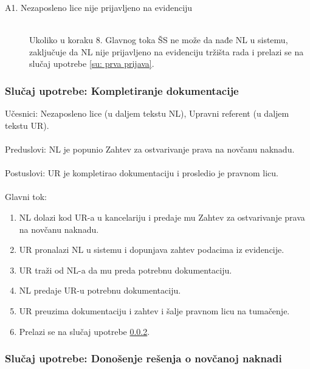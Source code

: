 \begin{description}
	\item[A1. Nezaposleno lice nije prijavljeno na evidenciju] ~\\
	Ukoliko u koraku 8. Glavnog toka ŠS ne može da nađe NL u sistemu, zaključuje da NL nije prijavljeno na evidenciju tržišta rada i prelazi se na slučaj upotrebe \ref{su: prva prijava}.
\end{description}

\subsubsection{Slu\v caj upotrebe: Kompletiranje dokumentacije}
\label{su: kompletiranje dokumentacije}

\noindent Učesnici: Nezaposleno lice (u daljem tekstu NL), Upravni referent (u daljem tekstu UR).
\\
\\ Preduslovi: NL je popunio Zahtev za ostvarivanje prava na novčanu naknadu.
\\
\\ Postuslovi: UR je kompletirao dokumentaciju i prosledio je pravnom licu.
\\
\\ Glavni tok:
\begin{enumerate}
\item NL dolazi kod UR-a u kancelariju i predaje mu Zahtev za ostvarivanje prava na novčanu naknadu.
\item UR pronalazi NL u sistemu i dopunjava zahtev podacima iz evidencije.
\item UR traži od NL-a da mu preda potrebnu dokumentaciju.
\item NL predaje UR-u potrebnu dokumentaciju.
\item UR preuzima dokumentaciju i zahtev i šalje pravnom licu na tumačenje.
\item Prelazi se na slu\v caj upotrebe \ref{su: resenje}.
\end{enumerate}

\subsubsection{Slu\v caj upotrebe: Donošenje rešenja o novčanoj naknadi}
\label{su: resenje}

